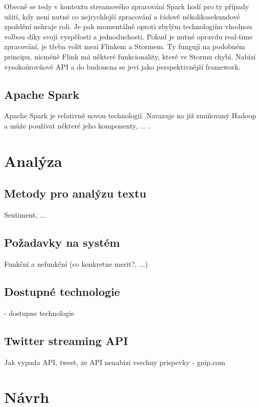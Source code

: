 \documentclass[thesis=B,czech]{FITthesis}[2012/06/26]
\begin{document}
	Obecně se tedy v kontextu streamového zpracování Spark hodí pro ty případy užití, kdy není nutné co nejrychlejší zpracování a řádově několikasekundové zpoždění nehraje roli. Je pak momentálně oproti zbylým technologiím vhodnou volbou díky svojí vyspělosti a jednoduchosti. Pokud je nutné opravdu real-time zpracování, je třeba volit mezi Flinkem a Stormem. Ty fungují na podobném principu, nicméně Flink má některé funkcionality, které ve Stormu chybí. Nabízí vysokoúrovňové API a do budoucna se jeví jako perspektivnější framework. 
	
	
	
\section{Apache Spark}
	Apache Spark je relativně novou technologií. Navazuje na již zmiňovaný Hadoop a může používat některé jeho komponenty, ... . 





\chapter{Analýza}
\section{Metody pro analýzu textu}
	Sentiment, ...

\section{Požadavky na systém}
	Funkční a nefunkční (co konkretne merit?, ...)

\section{Dostupné technologie}
	- dostupne technologie

\section{Twitter streaming API}
	Jak vypada API, tweet, ze API nenabizi vsechny prispevky - gnip.com

\chapter{Návrh}
\end{document}
